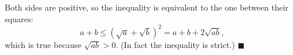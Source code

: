 Both sides are positive, so the inequality is equivalent to the one between their squares:
\[a+b\le\left(\sqrt a+\sqrt b\right)^2=a+b+2\sqrt{ab},\]
which is true because $\sqrt{ab}>0$. (In fact the inequality is strict.) $\blacksquare$
